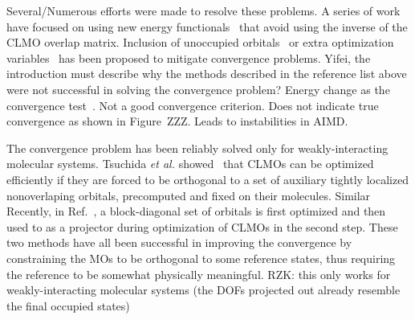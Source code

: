 \documentclass[aps,prl,twocolumn,reprint,amsmath,amssymb]{revtex4-1}
\begin{document}
Several/Numerous efforts were made to resolve these problems. A series of work have focused on using new energy functionals~\cite{mauri1993orbital,kim1995total,ordejon1995linear} that avoid using the inverse of the CLMO overlap matrix. 
Inclusion of unoccupied orbitals~\cite{kim1995total} or extra optimization variables~\cite{burger2008linear,peng2013effective} has been proposed to mitigate convergence problems. 
\new Yifei, the introduction must describe why the methods described in the reference list above were not successful in solving the convergence problem? \old Energy change as the convergence test~\cite{fattebert2000towards, kim1995total, ordejon1995linear}. Not a good convergence criterion. Does not indicate true convergence as shown in Figure~ZZZ. Leads to instabilities in AIMD.

The convergence problem has been reliably solved only for weakly-interacting molecular systems. Tsuchida \emph{et al.} showed~\cite{tsuchida2007augmented,tsuchida2008ab} that CLMOs can be optimized efficiently if they are forced to be orthogonal to  a set of auxiliary tightly localized nonoverlaping orbitals, precomputed and fixed on their molecules. Similar Recently, in Ref.~, a block-diagonal set of orbitals is first optimized and then used to as a projector during optimization of CLMOs in the second step. These two methods have all been successful in improving the convergence by constraining the MOs to be orthogonal to some reference states, thus requiring the reference to be somewhat physically meaningful. RZK: this only works for weakly-interacting molecular systems (the DOFs projected out already resemble the final occupied states)
\end{document}
